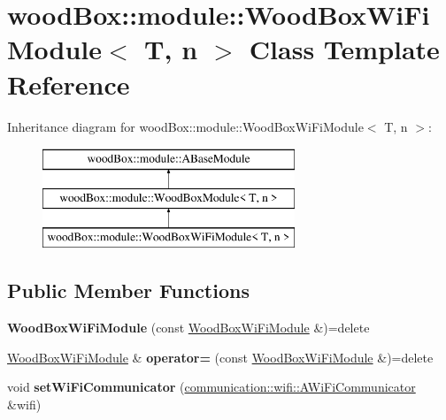 \hypertarget{classwood_box_1_1module_1_1_wood_box_wi_fi_module}{}\section{wood\+Box\+:\+:module\+:\+:Wood\+Box\+Wi\+Fi\+Module$<$ T, n $>$ Class Template Reference}
\label{classwood_box_1_1module_1_1_wood_box_wi_fi_module}
Inheritance diagram for wood\+Box\+:\+:module\+:\+:Wood\+Box\+Wi\+Fi\+Module$<$ T, n $>$\+:\begin{figure}[H]
\begin{center}
\leavevmode
\includegraphics[height=3.000000cm]{classwood_box_1_1module_1_1_wood_box_wi_fi_module}
\end{center}
\end{figure}
\subsection*{Public Member Functions}
\begin{DoxyCompactItemize}
\item 
\mbox{\label{classwood_box_1_1module_1_1_wood_box_wi_fi_module_aac99d548520fa9c5f5a29aa99bdc241d}} 
{\bfseries Wood\+Box\+Wi\+Fi\+Module} (const \mbox{\hyperlink{classwood_box_1_1module_1_1_wood_box_wi_fi_module}{Wood\+Box\+Wi\+Fi\+Module}} \&)=delete
\item 
\mbox{\label{classwood_box_1_1module_1_1_wood_box_wi_fi_module_aba3f7e5c892542d70db28130eddb3084}} 
\mbox{\hyperlink{classwood_box_1_1module_1_1_wood_box_wi_fi_module}{Wood\+Box\+Wi\+Fi\+Module}} \& {\bfseries operator=} (const \mbox{\hyperlink{classwood_box_1_1module_1_1_wood_box_wi_fi_module}{Wood\+Box\+Wi\+Fi\+Module}} \&)=delete
\item 
\mbox{\label{classwood_box_1_1module_1_1_wood_box_wi_fi_module_ad1fa85749c0e194c9e589261dfb2433d}} 
void {\bfseries set\+Wi\+Fi\+Communicator} (\mbox{\hyperlink{classwood_box_1_1communication_1_1wifi_1_1_a_wi_fi_communicator}{communication\+::wifi\+::\+A\+Wi\+Fi\+Communicator}} \&wifi)
\end{DoxyCompactItemize}
